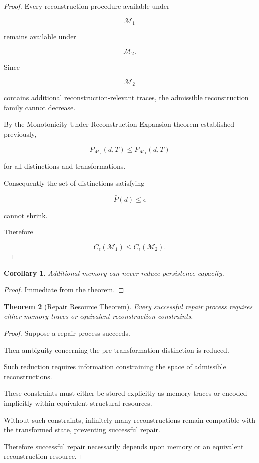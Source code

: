 \documentclass[12pt,oneside]{article}
\newtheorem{theorem}{Theorem}[section] \newtheorem{lemma}[theorem]{Lemma} \newtheorem{proposition}[theorem]{Proposition} \newtheorem{corollary}[theorem]{Corollary}
\theoremstyle{definition}
\begin{document}
\begin{proof}

Every reconstruction procedure available under

\[
\mathcal M_1
\]

remains available under

\[
\mathcal M_2.
\]

Since

\[
\mathcal M_2
\]

contains additional reconstruction-relevant traces, the admissible reconstruction family cannot decrease.

By the Monotonicity Under Reconstruction Expansion theorem established previously,

\[
P_{\mathcal M_2}(d,T)
\le
P_{\mathcal M_1}(d,T)
\]

for all distinctions and transformations.

Consequently the set of distinctions satisfying

\[
\bar P(d)\le\epsilon
\]

cannot shrink.

Therefore

\[
C_\epsilon(\mathcal M_1)
\le
C_\epsilon(\mathcal M_2).
\]

\end{proof}

\begin{corollary}

Additional memory can never reduce persistence capacity.

\end{corollary}

\begin{proof}

Immediate from the theorem.

\end{proof}

\begin{theorem}[Repair Resource Theorem]

Every successful repair process requires either memory traces or equivalent reconstruction constraints.

\end{theorem}

\begin{proof}

Suppose a repair process succeeds.

Then ambiguity concerning the pre-transformation distinction is reduced.

Such reduction requires information constraining the space of admissible reconstructions.

These constraints must either be stored explicitly as memory traces or encoded implicitly within equivalent structural resources.

Without such constraints, infinitely many reconstructions remain compatible with the transformed state, preventing successful repair.

Therefore successful repair necessarily depends upon memory or an equivalent reconstruction resource.

\end{proof}
\end{document}
